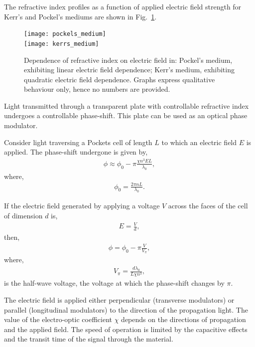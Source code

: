 The refractive index profiles as a function of applied electric field strength for Kerr's and Pockel's mediums are shown in Fig.~\ref{fig:EOM_ref_index}.

\begin{figure}[!htbp]
\texttt{[image: pockels\_medium]} \pubmode \\ \fi
\texttt{[image: kerrs\_medium]}
\captionspacefig \caption{Dependence of refractive index on electric field in: Pockel's medium, exhibiting linear electric field dependence; Kerr's medium, exhibiting quadratic electric field dependence. Graphs express qualitative behaviour only, hence no numbers are provided.}\label{fig:EOM_ref_index}
\end{figure}

Light transmitted through a transparent plate with controllable refractive index undergoes a controllable phase-shift. This plate can be used as an optical phase modulator.

Consider light traversing a Pockets cell of length $L$ to which an electric field $E$ is applied. The phase-shift undergone is given by,
\begin{align}
\phi \approx \phi_0 - \pi\frac{\chi n^3 E L}{\lambda_0},
\end{align}
where,
\begin{align}
\phi_0 = \frac{2\pi nL}{\lambda_0}.
\end{align}

If the electric field generated by applying a voltage $V$ across the faces of the cell of dimension $d$ is,
\begin{align}
	E=\frac{V}{d},
\end{align}
then,
\begin{align}
	\phi=\phi_0-\pi \frac{V}{V_\pi},
\end{align}
where,
\begin{align}
	V_\pi=\frac{d\lambda_0}{L\chi n^3},
\end{align}
is the half-wave voltage, the voltage at which the phase-shift changes by $\pi$.

The electric field is applied either perpendicular (transverse modulators) or parallel (longitudinal modulators) to the direction of the propagation light. The value of the electro-optic coefficient $\chi$ depends on the directions of propagation and the applied field. The speed of operation is limited by the capacitive effects and the transit time of the signal through the material. 

